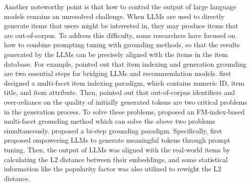 \documentclass[sn-mathphys-num]{sn-jnl}%
\theoremstyle{thmstyleone}%
\theoremstyle{thmstyletwo}%
\theoremstyle{thmstylethree}%
\begin{document}
Another noteworthy point is that how to control the output of large language models remains an unresolved challenge. When LLMs are used to directly generate items that users might be interested in, they may produce items that are out-of-corpus. To address this difficulty, some researchers have focused on how to combine prompting tuning with grounding methods, so that the results generated by the LLMs can be precisely aligned with the items in the item database. For example, \cite{lin2023multi} pointed out that item indexing and generation grounding are two essential steps for bridging LLMs and recommendation models. \cite{lin2023multi} first designed a multi-facet item indexing paradigm, which contains numeric ID, item title, and item attribute. Then, \cite{lin2023multi} pointed out that out-of-corpus identifiers and over-reliance on the quality of initially generated tokens are two critical problems in the generation process. To solve these problems, \cite{lin2023multi} proposed an FM-index-based multi-facet grounding method which can solve the above two problems simultaneously. \cite{bao2023bi} proposed a bi-step grounding paradigm. Specifically, \cite{bao2023bi} first proposed empowering LLMs to generate meaningful tokens through prompt tuning. Then, the output of LLMs was aligned with the real-world items by calculating the L2 distance between their embeddings, and some statistical information like the popularity factor was also utilized to rewight the L2 distance.
\end{document}

